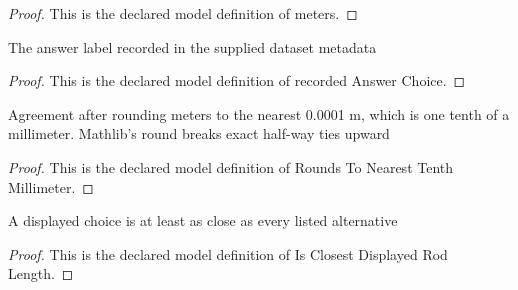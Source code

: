 \begin{proof}
  This is the declared model definition of meters.
\end{proof}
\begin{definition}
  \label{def:physics:phyx-mini-0276:phyxminiproblems-problemphyxmini0276-recordedanswerchoice}
  The answer label recorded in the supplied dataset metadata
\end{definition}
\begin{proof}
  This is the declared model definition of recorded Answer Choice.
\end{proof}
\begin{definition}
  \label{def:physics:phyx-mini-0276:phyxminiproblems-problemphyxmini0276-roundstonearesttenthmillimeter}
  Agreement after rounding meters to the nearest 0.0001 m, which is one tenth of a millimeter. Mathlib's round breaks exact half-way ties upward
\end{definition}
\begin{proof}
  This is the declared model definition of Rounds To Nearest Tenth Millimeter.
\end{proof}
\begin{definition}
  \label{def:physics:phyx-mini-0276:phyxminiproblems-problemphyxmini0276-isclosestdisplayedrodlength}
  A displayed choice is at least as close as every listed alternative
\end{definition}
\begin{proof}
  This is the declared model definition of Is Closest Displayed Rod Length.
\end{proof}
